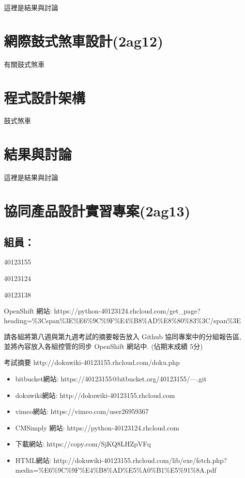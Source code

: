 \documentclass[]{article}
\begin{document}
這裡是結果與討論

\section{網際鼓式煞車設計(2ag12)}\label{ux7db2ux969bux9f13ux5f0fux715eux8ecaux8a2dux8a082ag12}

有關鼓式煞車

\section{程式設計架構}\label{ux7a0bux5f0fux8a2dux8a08ux67b6ux69cb-7}

鼓式煞車

\section{結果與討論}\label{ux7d50ux679cux8207ux8a0eux8ad6-7}

這裡是結果與討論

\section{協同產品設計實習專案(2ag13)}\label{ux5354ux540cux7522ux54c1ux8a2dux8a08ux5be6ux7fd2ux5c08ux68482ag13}

\subsection{組員：}\label{ux7d44ux54e1-1}

40123155

40123124

40123138

OpenShift 網站:
https://python-40123124.rhcloud.com/get\_page?heading=\%3Cspan\%3E\%E6\%9C\%9F\%E4\%B8\%AD\%E8\%80\%83\%3C/span\%3E

請各組將第八週與第九週考試的摘要報告放入 Github 協同專案中的分組報告區,
並將內容放入各組控管的同步 OpenShift 網站中. (佔期末成績 5分)

考試摘要 http://dokuwiki-40123155.rhcloud.com/doku.php

\begin{itemize}
\item
  bitbucket網站: https://40123155@bitbucket.org/40123155/---.git
\item
  dokuwiki網站: http://dokuwiki-40123155.rhcloud.com
\item
  vimeo網站: https://vimeo.com/user26959367
\item
  CMSimply 網站: https://python-40123124.rhcloud.com
\item
  下載網站: https://copy.com/SjKQ8LHZpVFq
\item
  HTML網站:
  http://dokuwiki-40123155.rhcloud.com/lib/exe/fetch.php?media=\%E6\%9C\%9F\%E4\%B8\%AD\%E5\%A0\%B1\%E5\%91\%8A.pdf
\end{itemize}
\end{document}

